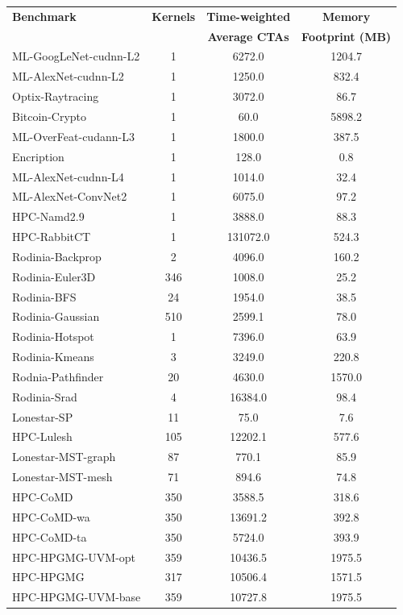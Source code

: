 \begin{table}[t]
\begin{small}
\centering
\begin{tabular}{lccc}
 \toprule
 \textbf{Benchmark} & \textbf{Kernels} & \textbf{Time-weighted} & \textbf{Memory} \\
& & \textbf{Average CTAs} & \textbf{Footprint (MB)} \\
 \toprule
ML-GoogLeNet-cudnn-L2 & 1 & 6272.0 & 1204.7 \\
ML-AlexNet-cudnn-L2 & 1 & 1250.0 & 832.4 \\
Optix-Raytracing & 1 & 3072.0 & 86.7 \\
Bitcoin-Crypto & 1 & 60.0 & 5898.2 \\
ML-OverFeat-cudann-L3 & 1 & 1800.0 & 387.5 \\
Encription & 1 & 128.0 & 0.8 \\
ML-AlexNet-cudnn-L4 & 1 & 1014.0 & 32.4 \\
ML-AlexNet-ConvNet2 & 1 & 6075.0 & 97.2 \\
HPC-Namd2.9 & 1 & 3888.0 & 88.3 \\
HPC-RabbitCT & 1 & 131072.0 & 524.3 \\
Rodinia-Backprop & 2 & 4096.0 & 160.2 \\
Rodinia-Euler3D & 346 & 1008.0 & 25.2 \\
Rodinia-BFS & 24 & 1954.0 & 38.5 \\
Rodinia-Gaussian & 510 & 2599.1 & 78.0 \\
Rodinia-Hotspot & 1 & 7396.0 & 63.9 \\
Rodinia-Kmeans & 3 & 3249.0 & 220.8 \\
Rodnia-Pathfinder & 20 & 4630.0 & 1570.0 \\
Rodinia-Srad & 4 & 16384.0 & 98.4 \\
Lonestar-SP & 11 & 75.0 & 7.6 \\
HPC-Lulesh & 105 & 12202.1 & 577.6 \\
Lonestar-MST-graph & 87 & 770.1 & 85.9 \\
Lonestar-MST-mesh & 71 & 894.6 & 74.8 \\
HPC-CoMD & 350 & 3588.5 & 318.6 \\
HPC-CoMD-wa & 350 & 13691.2 & 392.8 \\
HPC-CoMD-ta & 350 & 5724.0 & 393.9 \\
HPC-HPGMG-UVM-opt & 359 & 10436.5 & 1975.5 \\
HPC-HPGMG & 317 & 10506.4 & 1571.5 \\
HPC-HPGMG-UVM-base & 359 & 10727.8 & 1975.5 \\

\end{tabular}
\end{small}
\end{table}
